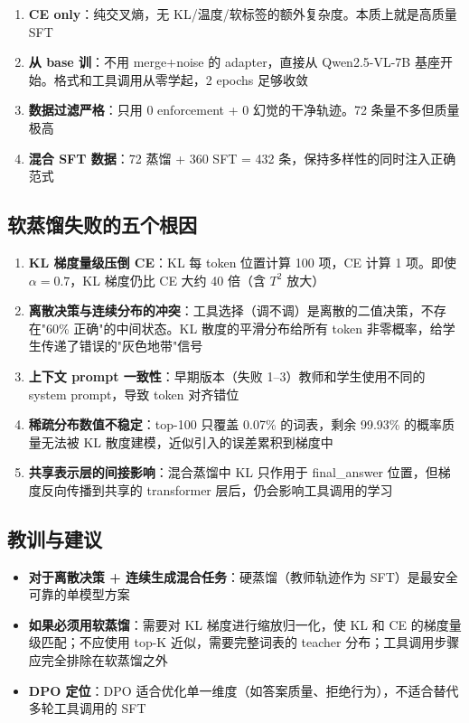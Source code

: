 \documentclass[12pt,a4paper]{ctexart}
\begin{document}
\begin{enumerate}
  \item \textbf{CE only}：纯交叉熵，无 KL/温度/软标签的额外复杂度。本质上就是高质量 SFT
  \item \textbf{从 base 训}：不用 merge+noise 的 adapter，直接从 Qwen2.5-VL-7B 基座开始。格式和工具调用从零学起，2 epochs 足够收敛
  \item \textbf{数据过滤严格}：只用 0 enforcement + 0 幻觉的干净轨迹。72 条量不多但质量极高
  \item \textbf{混合 SFT 数据}：72 蒸馏 + 360 SFT = 432 条，保持多样性的同时注入正确范式
\end{enumerate}

\subsection{软蒸馏失败的五个根因}

\begin{enumerate}
  \item \textbf{KL 梯度量级压倒 CE}：KL 每 token 位置计算 100 项，CE 计算 1 项。即使 $\alpha=0.7$，KL 梯度仍比 CE 大约 40 倍（含 $T^2$ 放大）
  \item \textbf{离散决策与连续分布的冲突}：工具选择（调不调）是离散的二值决策，不存在"60\% 正确"的中间状态。KL 散度的平滑分布给所有 token 非零概率，给学生传递了错误的"灰色地带"信号
  \item \textbf{上下文 prompt 一致性}：早期版本（失败 1--3）教师和学生使用不同的 system prompt，导致 token 对齐错位
  \item \textbf{稀疏分布数值不稳定}：top-100 只覆盖 0.07\% 的词表，剩余 99.93\% 的概率质量无法被 KL 散度建模，近似引入的误差累积到梯度中
  \item \textbf{共享表示层的间接影响}：混合蒸馏中 KL 只作用于 final\_answer 位置，但梯度反向传播到共享的 transformer 层后，仍会影响工具调用的学习
\end{enumerate}

\subsection{教训与建议}

\begin{itemize}[nosep]
  \item \textbf{对于离散决策 + 连续生成混合任务}：硬蒸馏（教师轨迹作为 SFT）是最安全可靠的单模型方案
  \item \textbf{如果必须用软蒸馏}：需要对 KL 梯度进行缩放归一化，使 KL 和 CE 的梯度量级匹配；不应使用 top-K 近似，需要完整词表的 teacher 分布；工具调用步骤应完全排除在软蒸馏之外
  \item \textbf{DPO 定位}：DPO 适合优化单一维度（如答案质量、拒绝行为），不适合替代多轮工具调用的 SFT
\end{itemize}
\end{document}
